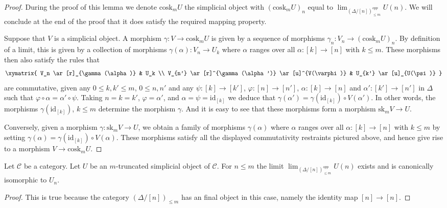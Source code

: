 \begin{proof}
During the proof of this lemma we denote $\text{cosk}_mU$ the
simplicial object with $(\text{cosk}_mU)_n$ equal to
$\lim_{(\Delta/[n])_{\leq m}^{opp}} U(n)$.
We will conclude at the end of the proof that it does
satisfy the required mapping property.

\medskip\noindent
Suppose that $V$ is a simplicial object.
A morphism $\gamma : V \to \text{cosk}_mU$ is given by a sequence
of morphisms $\gamma_n : V_n \to (\text{cosk}_mU)_n$.
By definition of a limit, this is given by a
collection of morphisms $\gamma(\alpha) : V_n \to U_k$
where $\alpha$ ranges over all $\alpha : [k] \to [n]$
with $k \leq m$. These morphisms then also satisfy
the rules that
$$
\xymatrix{
V_n \ar[r]_{\gamma(\alpha)} &  U_k \\
V_{n'} \ar[r]^{\gamma(\alpha')} \ar[u]^{V(\varphi)} & U_{k'} \ar[u]_{U(\psi)}
}
$$
are commutative, given any $0 \leq k, k' \leq m$, $0 \leq n, n'$
and any $\psi : [k] \to [k']$, $\varphi : [n] \to [n']$,
$\alpha : [k] \to [n]$ and $\alpha' : [k'] \to [n']$ in $\Delta$
such that $\varphi \circ \alpha = \alpha' \circ \psi$.
Taking $n = k = k'$, $\varphi = \alpha'$, and $\alpha = \psi = \text{id}_{[k]}$
we deduce that $\gamma(\alpha') = \gamma(\text{id}_{[k]}) \circ V(\alpha')$.
In other words, the morphisms $\gamma(\text{id}_{[k]})$, $k \leq m$
determine the morphism $\gamma$. And it is easy to see that these
morphisms form a morphism $\text{sk}_m V \to U$.

\medskip\noindent
Conversely, given a morphism $\gamma : \text{sk}_m V \to U$,
we obtain a family of morphisms $\gamma(\alpha)$
where $\alpha$ ranges over all $\alpha : [k] \to [n]$
with $k \leq m$ by setting $\gamma(\alpha) =
\gamma(\text{id}_{[k]}) \circ V(\alpha)$. These morphisms
satisfy all the displayed commutativity restraints pictured
above, and hence give rise to a morphism $V \to \text{cosk}_m U$.
\end{proof}

\begin{lemma}
\label{lemma-trivial-cosk}
Let $\mathcal{C}$ be a category.
Let $U$ be an $m$-truncated simplicial object of $\mathcal{C}$.
For $n \leq m$ the limit $\lim_{(\Delta/[n])_{\leq m}^{opp}} U(n)$
exists and is canonically isomorphic to $U_n$.
\end{lemma}

\begin{proof}
This is true because the category $(\Delta/[n])_{\leq m}$
has an final object in this case, namely the identity
map $[n] \to [n]$.
\end{proof}

